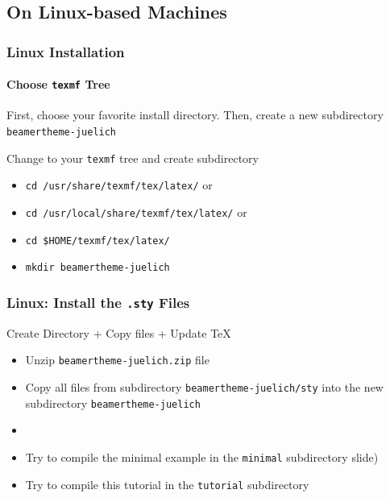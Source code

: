 \documentclass[
t, %
10pt, %
aspectratio=1610, %
ngerman,
english,
]{beamer}
\begin{document}
\subsection{On Linux-based Machines}
\begin{frame}[fragile]
	\frametitle{Linux Installation}
	\framesubtitle{Choose {\tt texmf} Tree}
	First, choose your favorite install directory.	\newline
	Then, create a new subdirectory \verb+beamertheme-juelich+
	\begin{block}{Change to your {\tt texmf} tree and create subdirectory}
    \begin{itemize}
      \item \verb+cd /usr/share/texmf/tex/latex/+ \hfill or
      \item \verb+cd /usr/local/share/texmf/tex/latex/+ \hfill or
      \item \verb+cd $HOME/texmf/tex/latex/+
      \item \verb+mkdir beamertheme-juelich+
    \end{itemize}
    \end{block}
\end{frame}

\begin{frame}[fragile]
	\frametitle{Linux: Install the {\tt .sty} Files}
	\begin{block}{Create Directory + Copy files + Update \TeX}
    	\begin{itemize}
          	\item Unzip \verb+beamertheme-juelich.zip+ file
      		\item Copy all files from subdirectory \verb+beamertheme-juelich/sty+ into
      		the new subdirectory \verb+beamertheme-juelich+
      		\item[] 
      		\item Try to compile the minimal example in the \verb+minimal+ subdirectory slide)
      		\item Try to compile this tutorial in the \verb+tutorial+ subdirectory
     	\end{itemize}
    \end{block}
\end{frame}
\end{document}
